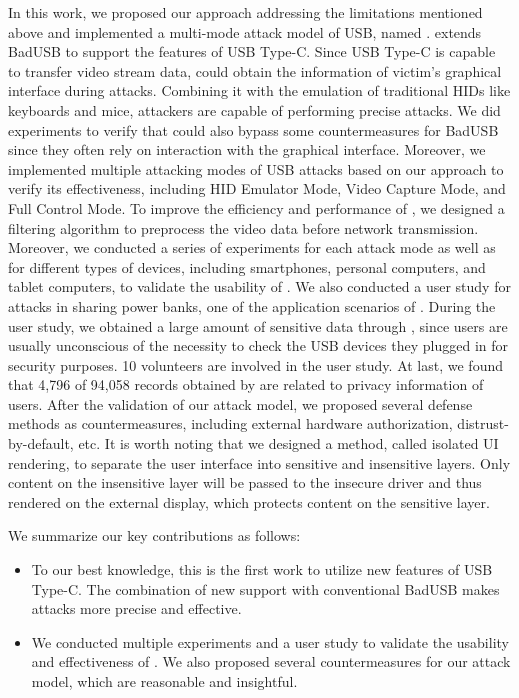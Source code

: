 In this work, we proposed our approach addressing the limitations mentioned
above and implemented a multi-mode attack model of USB, named \tool.  \tool
extends BadUSB to support the features of USB Type-C.  Since USB Type-C is
capable to transfer video stream data, \tool could obtain the information of
victim's graphical interface during attacks.  Combining it with the emulation
of traditional HIDs like keyboards and mice, attackers are capable of
performing precise attacks.  We did experiments to verify that \tool could also
bypass some countermeasures for BadUSB since they often rely on interaction
with the graphical interface.  Moreover, we implemented multiple attacking
modes of USB attacks based on our approach to verify its effectiveness,
including HID Emulator Mode, Video Capture Mode, and Full Control Mode.  To improve the
efficiency and performance of \tool, we designed a filtering algorithm to
preprocess the video data before network transmission.  Moreover, we conducted
a series of experiments for each attack mode as well as for different types of
devices, including smartphones, personal computers, and tablet computers, to
validate the usability of \tool.  We also conducted a user study for attacks in
sharing power banks, one of the application scenarios of \tool.  During the
user study, we obtained a large amount of sensitive data through \tool, since
users are usually unconscious of the necessity to check the USB devices they
plugged in for security purposes.  
10 volunteers are involved in the user study.
At last, we found that 4,796 of 94,058 records obtained by \tool are related to privacy information of users.
After the validation of our attack model, we
proposed several defense methods as countermeasures, including external
hardware authorization, distrust-by-default, etc.  It is worth noting that we
designed a method, called isolated UI rendering, to separate the user interface
into sensitive and insensitive layers.  Only content on the insensitive layer
will be passed to the insecure driver and thus rendered on the external
display, which protects content on the sensitive layer.

We summarize our key contributions as follows:

\begin{itemize} 
    
    \item To our best knowledge, this is the first work to utilize new features
	of USB Type-C.  The combination of new support with conventional BadUSB
	makes attacks more precise and effective.
	
	
    \item We conducted multiple experiments and a user study to validate the
	usability and effectiveness of \tool.  We also proposed several
	countermeasures for our attack model, which are reasonable and
	insightful. 
\end{itemize}

